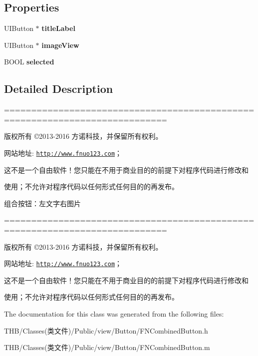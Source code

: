 \subsection*{Properties}
\begin{DoxyCompactItemize}
\item 
\mbox{\label{interface_f_n_combined_button_a62f4358aac347d29d19f07493af04b50}} 
U\+I\+Button $\ast$ {\bfseries title\+Label}
\item 
\mbox{\label{interface_f_n_combined_button_a507f8c48a5317c1a37e8af4145eb7bb8}} 
U\+I\+Button $\ast$ {\bfseries image\+View}
\item 
\mbox{\label{interface_f_n_combined_button_a4dbc617a22a15e9611f80e8e9063f42a}} 
B\+O\+OL {\bfseries selected}
\end{DoxyCompactItemize}


\subsection{Detailed Description}
============================================================================

版权所有 ©2013-\/2016 方诺科技，并保留所有权利。

网站地址\+: \href{http://www.fnuo123.com}{\tt http\+://www.\+fnuo123.\+com}； 



这不是一个自由软件！您只能在不用于商业目的的前提下对程序代码进行修改和

使用；不允许对程序代码以任何形式任何目的的再发布。 



组合按钮：左文字右图片

============================================================================

版权所有 ©2013-\/2016 方诺科技，并保留所有权利。

网站地址\+: \href{http://www.fnuo123.com}{\tt http\+://www.\+fnuo123.\+com}； 



这不是一个自由软件！您只能在不用于商业目的的前提下对程序代码进行修改和

使用；不允许对程序代码以任何形式任何目的的再发布。 

 

The documentation for this class was generated from the following files\+:\begin{DoxyCompactItemize}
\item 
T\+H\+B/\+Classes(类文件)/\+Public/view/\+Button/F\+N\+Combined\+Button.\+h\item 
T\+H\+B/\+Classes(类文件)/\+Public/view/\+Button/F\+N\+Combined\+Button.\+m\end{DoxyCompactItemize}
